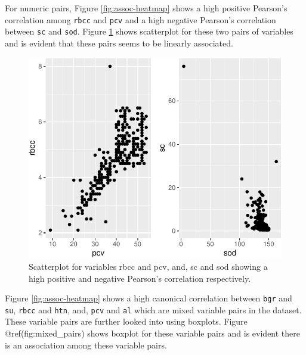 For numeric pairs, Figure \ref{fig:assoc-heatmap} shows a high positive
Pearson's correlation among \texttt{rbcc} and \texttt{pcv} and a high
negative Pearson's correlation between \texttt{sc} and \texttt{sod}.
Figure \ref{fig:numeric-pairs} shows scatterplot for these two pairs of
variables and is evident that these pairs seems to be linearly
associated.

\begin{Schunk}
\begin{figure}

{\centering \includegraphics{rj_paper_files/figure-latex/numeric-pairs-1} 

}

\caption[Scatterplot for variables rbcc and pcv, and, sc and sod showing a high positive and negative Pearson's correlation respectively]{Scatterplot for variables rbcc and pcv, and, sc and sod showing a high positive and negative Pearson's correlation respectively.}\label{fig:numeric-pairs}
\end{figure}
\end{Schunk}

Figure \ref{fig:assoc-heatmap} shows a high canonical correlation
between \texttt{bgr} and \texttt{su}, \texttt{rbcc} and \texttt{htn},
and, \texttt{pcv} and \texttt{al} which are mixed variable pairs in the
dataset. These variable pairs are further looked into using boxplots.
Figure @ref(fig:mixed\_pairs) shows boxplot for these variable pairs and
is evident there is an association among these variable pairs.

